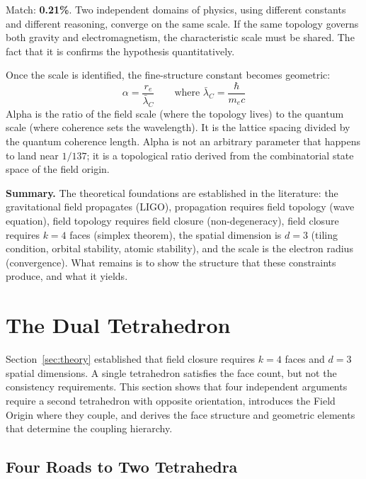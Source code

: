 \documentclass[aps,prd,preprint,superscriptaddress,showpacs,preprintnumbers,amsmath,amssymb,nofootinbib]{revtex4-2}
\begin{document}
Match: \textbf{0.21\%}. Two independent domains of physics, using different constants and different reasoning, converge on the same scale. If the same topology governs both gravity and electromagnetism, the characteristic scale must be shared. The fact that it is confirms the hypothesis quantitatively.

Once the scale is identified, the fine-structure constant becomes geometric:
\begin{equation}
\alpha = \frac{r_e}{\bar{\lambda}_C} \qquad \text{where } \bar{\lambda}_C = \frac{\hbar}{m_e c}
\end{equation}
Alpha is the ratio of the field scale (where the topology lives) to the quantum scale (where coherence sets the wavelength). It is the lattice spacing divided by the quantum coherence length. Alpha is not an arbitrary parameter that happens to land near $1/137$; it is a topological ratio derived from the combinatorial state space of the field origin.

\vspace{1em}
\noindent\textbf{Summary.} The theoretical foundations are established in the literature: the gravitational field propagates (LIGO), propagation requires field topology (wave equation), field topology requires field closure (non-degeneracy), field closure requires $k = 4$ faces (simplex theorem), the spatial dimension is $d = 3$ (tiling condition, orbital stability, atomic stability), and the scale is the electron radius (convergence). What remains is to show the structure that these constraints produce, and what it yields.

\section{The Dual Tetrahedron}
\label{sec:foundation}

Section~\ref{sec:theory} established that field closure requires $k = 4$ faces and $d = 3$ spatial dimensions. A single tetrahedron satisfies the face count, but not the consistency requirements. This section shows that four independent arguments require a second tetrahedron with opposite orientation, introduces the Field Origin where they couple, and derives the face structure and geometric elements that determine the coupling hierarchy.

\subsection{Four Roads to Two Tetrahedra}
\label{subsec:two-tet}
\end{document}
